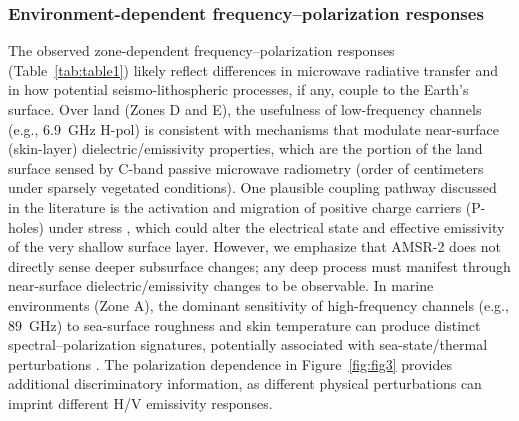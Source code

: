 \documentclass[preprint,review,12pt,authoryear]{elsarticle}
\begin{document}
\subsubsection{Environment-dependent frequency--polarization responses}
The observed zone-dependent frequency--polarization responses (Table~\ref{tab:table1}) likely reflect differences in microwave radiative transfer and in how potential seismo-lithospheric processes, if any, couple to the Earth's surface. Over land (Zones D and E), the usefulness of low-frequency channels (e.g., 6.9~GHz H-pol) is consistent with mechanisms that modulate near-surface (skin-layer) dielectric/emissivity properties, which are the portion of the land surface sensed by C-band passive microwave radiometry (order of centimeters under sparsely vegetated conditions). One plausible coupling pathway discussed in the literature is the activation and migration of positive charge carriers (P-holes) under stress \citep{freundPreearthquakeSignalsUnderlying2011}, which could alter the electrical state and effective emissivity of the very shallow surface layer. However, we emphasize that AMSR-2 does not directly sense deeper subsurface changes; any deep process must manifest through near-surface dielectric/emissivity changes to be observable. In marine environments (Zone A), the dominant sensitivity of high-frequency channels (e.g., 89~GHz) to sea-surface roughness and skin temperature can produce distinct spectral--polarization signatures, potentially associated with sea-state/thermal perturbations \citep{liuGeneralFeaturesMultiparameter2023}. The polarization dependence in Figure~\ref{fig:fig3} provides additional discriminatory information, as different physical perturbations can imprint different H/V emissivity responses.
\end{document}
